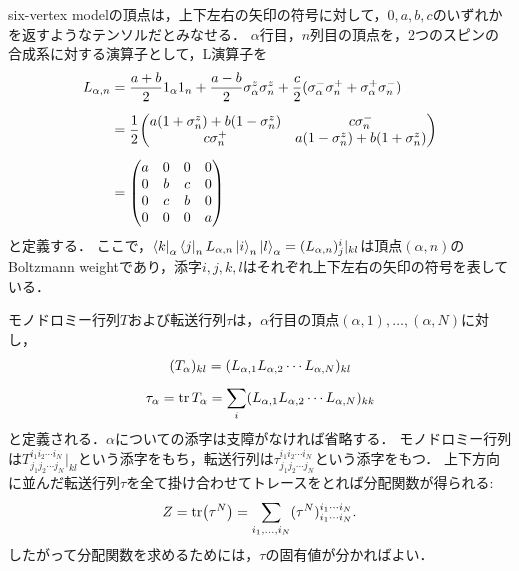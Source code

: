 \documentclass[\main/main.tex]{subfiles}
\begin{document}
\begin{frame}
    six-vertex modelの頂点は，上下左右の矢印の符号に対して，$0,a,b,c$のいずれかを返すようなテンソルだとみなせる．
    $\alpha$行目，$n$列目の頂点を，2つのスピンの合成系に対する演算子として，L演算子を
    \begin{align}
        L_{\alpha,n} &
        = \frac{a+b}{2} 1_\alpha 1_n + \frac{a-b}{2} \sigma_\alpha^z \sigma_n^z + \frac{c}{2}(\sigma_\alpha^- \sigma_n^+ + \sigma_\alpha^+ \sigma_n^-)
        \\[5pt] &
        = \frac{1}{2}\mqty(
            a(1+\sigma_n^z) + b(1-\sigma_n^z) & 
            c\sigma_n^- \\
            c\sigma_n^+ &
            a(1-\sigma_n^z) + b(1+\sigma_n^z)
            )
        \\[5pt] &
        = \mqty(
            a&0&0&0 \\
            0&b&c&0 \\
            0&c&b&0 \\
            0&0&0&a
        )
    \end{align}
    と定義する．
    ここで，$\bra{k}_\alpha \bra{j}_n   L_{\alpha,n} \ket{i}_n \ket{l}_\alpha = (  L_{\alpha,n})^i_j|_{kl}$は頂点$(\alpha,n)$のBoltzmann weightであり，添字$i,j,k,l$はそれぞれ上下左右の矢印の符号を表している．
\end{frame}

\begin{frame}{}
      モノドロミー行列$T$および転送行列$\tau$は，$\alpha$行目の頂点$(\alpha,1),\ldots,(\alpha,N)$に対し，
    \begin{gather}
        (T_\alpha)_{kl} = (L_{\alpha,1} L_{\alpha,2} \cdots L_{\alpha,N})_{kl} 
        \\[5pt]
        \tau_\alpha = \tr T_\alpha = \sum_{i} (L_{\alpha,1} L_{\alpha,2} \cdots L_{\alpha,N})_{kk}
    \end{gather}
    と定義される．$\alpha$についての添字は支障がなければ省略する．
    モノドロミー行列は$T_{j_1j_2\cdots j_N}^{i_1i_2\cdots i_N}|_{kl}$という添字をもち，転送行列は$\tau_{j_1j_2\cdots j_N}^{i_1i_2\cdots i_N}$という添字をもつ．
    上下方向に並んだ転送行列$\tau$を全て掛け合わせてトレースをとれば分配関数が得られる:
    \begin{align}
        Z = \tr(\tau^N) = \sum_{i_1,\ldots,i_N} (\tau^N)_{i_1 \cdots i_N}^{i_1 \cdots i_N}.
    \end{align}
    したがって分配関数を求めるためには，$\tau$の固有値が分かればよい．
\end{frame}
\end{document}
